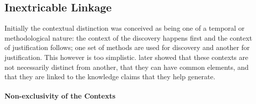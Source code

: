 \documentclass[a4paper]{article}
\begin{document}
\subsection{Inextricable Linkage}

Initially the contextual distinction was conceived as being one of a temporal
or methodological nature: the context of the discovery happens first and the
context of justification follows; one set of methods are used for discovery
and another for justification. This however is too simplistic.
\cite{kuhn1970structure} later showed that these contexts are not necessarily
distinct from another, that they can have common elements, and that they are
linked to the knowledge claims that they help generate. 

\paragraph{Non-exclusivity of the Contexts}
\label{part}
\end{document}

